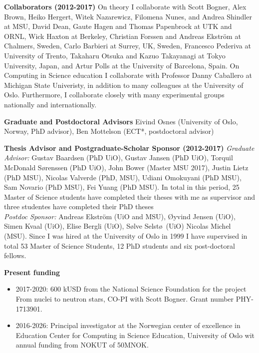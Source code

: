 \documentclass[10pt,a4wide]{revtex4-1}
\begin{document}
\noindent
{\bf Collaborators (2012-2017)}
On theory I collaborate
with Scott Bogner, Alex Brown, Heiko Hergert, Witek Nazarewicz, Filomena Nunes, and Andrea Shindler at MSU, 
David Dean, Gaute Hagen and Thomas Papenbrock at UTK
and ORNL, Wick Haxton at Berkeley, 
Christian Forssen and Andreas Ekstr\"om at Chalmers, Sweden, Carlo Barbieri at Surrey, UK, 
Sweden, Francesco Pederiva at University of Trento, Takaharu Otsuka and Kazuo Takayanagi at Tokyo University, Japan, 
and Artur Polls at the University of Barcelona, Spain.  On Computing in Science education I collaborate with Professor Danny Caballero at Michigan State Univeristy, in addition to many colleagues at the University of Oslo.
Furthermore, I collaborate closely with many experimental groups nationally and internationally.

\medskip

\noindent
{\bf Graduate and Postdoctoral Advisors}
Eivind Osnes (University of Oslo, Norway, PhD advisor), Ben Mottelson (ECT*, postdoctoral advisor)

\medskip

\noindent
{\bf Thesis Advisor and Postgraduate-Scholar Sponsor (2012-2017)}
\noindent
{\it Graduate Advisor:} Gustav Baardsen (PhD UiO), Gustav Jansen (PhD UiO), Torquil McDonald S\o renssen (PhD UiO),
John Bower (Master MSU 2017), Justin Lietz (PhD MSU), Nicolas Valverde (PhD, MSU), Udiani Omokuyani (PhD MSU),  Sam Novario (PhD MSU), Fei Yuang (PhD MSU). In total in this period,
25 Master of Science students have completed their theses with me as supervisor and three studentes have completed their  PhD theses \\ {\it Postdoc
Sponsor:} Andreas Ekstr\"om (UiO and MSU), \O yvind Jensen (UiO),
Simen Kvaal (UiO), Elise Bergli (UiO), S\o lve Selst\o\ (UiO) Nicolas
Michel (MSU). Since I was hired at the University of Oslo in 1999 I have supervised in total 53 Master of Science Students, 12 PhD students and six post-doctoral fellows.

\noindent
{\bf Present funding}
\begin{itemize}
\item 2017-2020: 600 kUSD from the National Science Foundation for the project From nuclei to neutron stars, CO-PI with Scott Bogner. Grant number PHY-1713901. 
\item 2016-2026: Principal investigator at the Norwegian center of excellence in Education Center for Computing in Science Education, University of Oslo wit annual funding from NOKUT of 50MNOK. 
\end{itemize}
\end{document}
